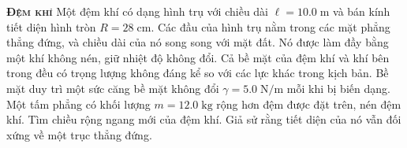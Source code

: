 	

\begin{problem}{\textbf{\textsc{Đệm khí}}}
Một đệm khí có dạng hình trụ với chiều dài $\ell=10.0\;\mathrm{m}$ và bán kính tiết diện hình tròn $R=28\;\mathrm{cm}$. Các đầu của hình trụ nằm trong các mặt phẳng thẳng đứng, và chiều dài của nó song song với mặt đất. Nó được làm đầy bằng một khí không nén, giữ nhiệt độ không đổi. Cả bề mặt của đệm khí và khí bên trong đều có trọng lượng không đáng kể so với các lực khác trong kịch bản. Bề mặt duy trì một sức căng bề mặt không đổi $\gamma=5.0\;\mathrm{N/m}$ mỗi khi bị biến dạng. Một tấm phẳng có khối lượng $m=12.0\;\mathrm{kg}$ rộng hơn đệm được đặt trên, nén đệm khí. Tìm chiều rộng ngang mới của đệm khí. Giả sử rằng tiết diện của nó vẫn đối xứng về một trục thẳng đứng.   
\end{problem}
